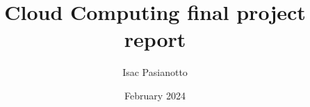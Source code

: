 \documentclass[a4paper]{article}
\begin{document}
\title{Cloud Computing final project report}
\author{Isac Pasianotto}
\date{February 2024}
\maketitle
\tableofcontents
\newpage



\newpage





\end{document}
